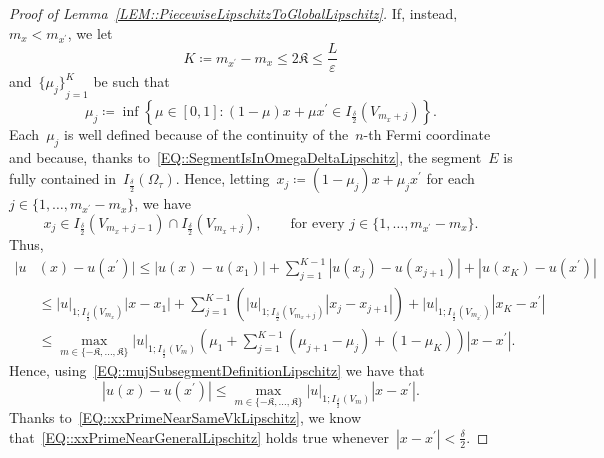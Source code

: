 \documentclass[12pt,a4paper]{amsart}
\numberwithin{equation}{section}
\theoremstyle{definition}
\theoremstyle{remark}
\newcommand{\eps}{\varepsilon}
\newcommand{\abs}[1]{\left\lvert#1\right\rvert}
\renewcommand{\leq}{\leqslant}
\begin{document}
\begin{appendix}
\begin{proof}[Proof of Lemma~\ref{LEM::PiecewiseLipschitzToGlobalLipschitz}]
    If, instead,~$m_x < m_{x^\prime}$, we let
    \begin{equation}\label{OLD::EQ::KdefinitionAndBound}
        K \coloneq m_{x^\prime} - m_x \leq 2\mathfrak{K} \leq \frac{L}{\eps}
    \end{equation}
    and~${\{\mu_j\}}_{j=1}^K$ be such that
    \begin{equation}\label{EQ::mujSubsegmentDefinitionLipschitz}
        \mu_j \coloneq \inf\left\{\mu \in [0,1] \colon (1-\mu)x + \mu x^\prime \in I_{\frac{\delta}{2}}(V_{m_x + j})\right\}.
    \end{equation}
    Each~$\mu_j$ is well defined because of the continuity of the~$n$-th Fermi coordinate and because, thanks to~\eqref{EQ::SegmentIsInOmegaDeltaLipschitz}, the segment~$E$ is fully contained in~$I_{\frac{\delta}{2}}(\Omega_\tau)$. Hence, letting~$x_j \coloneq (1-\mu_j)x + \mu_j x^\prime$ for each~$j \in \{1,\dots,m_{x^\prime}-m_x\}$, we have
    \begin{equation}
        x_j \in I_{\frac{\delta}{2}}(V_{m_x + j - 1})\cap I_{\frac{\delta}{2}}(V_{m_x + j}),\qquad \text{for every }j \in \{1,\dots,m_{x^\prime}-m_x\}.
    \end{equation}
    Thus,
    \begin{equation}
        \begin{split}
            |u&(x)-u(x^\prime)| \leq \abs{u(x)-u(x_1)} + \sum_{j=1}^{K-1} \abs{u(x_j)-u(x_{j+1})} + \abs{u(x_K)-u(x^\prime)}\\
                &\leq \abs{u}_{1; I_{\frac{\delta}{2}}(V_{m_x})} \abs{x-x_1} + \sum_{j=1}^{K-1} \left( \abs{u}_{1; I_{\frac{\delta}{2}}(V_{m_x + j})} \abs{x_j-x_{j+1}}\right)+\abs{u}_{1; I_{\frac{\delta}{2}}(V_{m_{x^\prime}})} \abs{x_K - x^\prime}\\
                &\leq \max_{m \in \{-\mathfrak{K},\dots,\mathfrak{K}\}} \abs{u}_{1; I_{\frac{\delta}{2}}(V_m)} \left( \mu_1 + \sum_{j=1}^{K-1} {(\mu_{j+1}-\mu_j)} + {(1-\mu_K)}\right)\abs{x-x^\prime}.
        \end{split}
    \end{equation}
    Hence, using~\eqref{EQ::mujSubsegmentDefinitionLipschitz} we have that
    \begin{equation}\label{EQ::xxPrimeNearGeneralLipschitz}
            |u(x)-u(x^\prime)| \leq \max_{m \in \{-\mathfrak{K},\dots,\mathfrak{K}\}} \abs{u}_{1; I_{\frac{\delta}{2}}(V_m)}\abs{x-x^\prime}.
    \end{equation}
    Thanks to~\eqref{EQ::xxPrimeNearSameVkLipschitz}, we know that~\eqref{EQ::xxPrimeNearGeneralLipschitz} holds true whenever~$\abs{x-x^\prime} < \frac{\delta}{2}$.


\end{proof}
\end{appendix}
\end{document}
